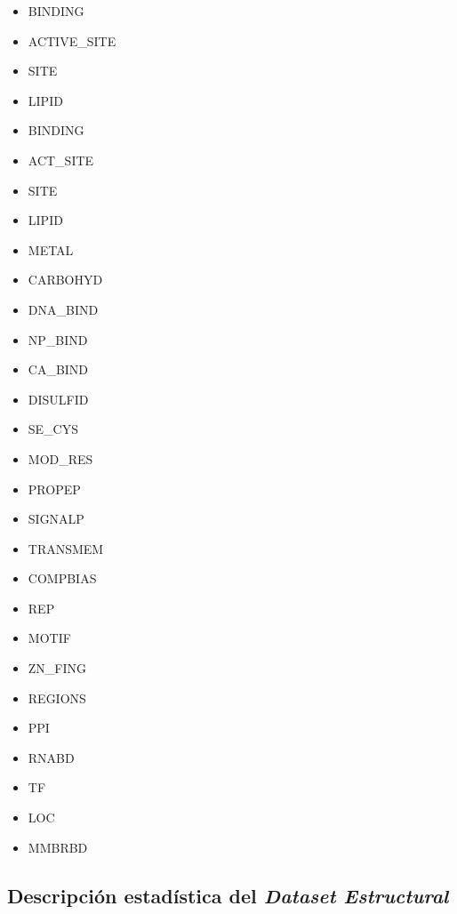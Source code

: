 \begin{itemize}
    \item BINDING
    \item ACTIVE\_SITE
    \item SITE
    \item LIPID
    \item BINDING
    \item ACT\_SITE
    \item SITE
    \item LIPID
    \item METAL
    \item CARBOHYD
    \item DNA\_BIND
    \item NP\_BIND
    \item CA\_BIND
    \item DISULFID
    \item SE\_CYS
    \item MOD\_RES
    \item PROPEP
    \item SIGNALP
    \item TRANSMEM
    \item COMPBIAS
    \item REP
    \item MOTIF
    \item ZN\_FING
    \item REGIONS
    \item PPI
    \item RNABD
    \item TF
    \item LOC
    \item MMBRBD
\end{itemize}

\vspace{2mm}
\vspace{2mm}

\subsection{Descripción estadística del \textit{Dataset Estructural}}

